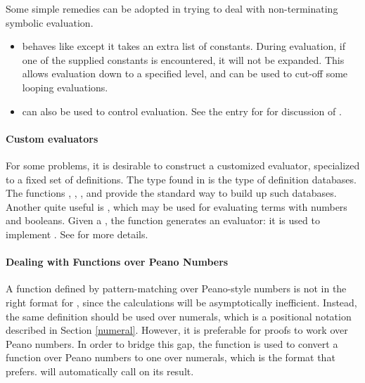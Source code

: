 {Some simple remedies can be adopted in trying to deal with
non-terminating symbolic evaluation.
\begin{itemize}
\item {} behaves like  except
  it takes an extra list of constants. During
  evaluation, if one of the supplied constants is encountered, it will
  not be expanded. This allows evaluation down to a specified level,
  and can be used to cut-off some looping evaluations.
\item {} can also be used to control
 evaluation. See the \REFERENCE{} entry for  for
 discussion of .

\end{itemize}

\paragraph{Custom evaluators}

For some problems, it is desirable to construct a customized
evaluator, specialized to a fixed set of definitions. The 
type found in  is the type of definition databases. The
functions , , , and
 provide the standard way to build up such
databases. Another quite useful  is
, which may be used for evaluating
terms with numbers and booleans.  Given a , the function
 generates an evaluator: it is used to implement .
See \REFERENCE{} for more details.

\paragraph{Dealing with Functions over Peano Numbers}

A function defined by pattern-matching over Peano-style numbers is not
in the right format for , since the calculations will be
asymptotically inefficient. Instead, the same definition should be
used over numerals, which is a positional notation described in
Section \ref{numeral}. However, it is preferable for proofs to work
over Peano numbers. In order to bridge this gap, the function
 is used to convert a function
over Peano numbers to one over numerals, which is the format that
 prefers.  will automatically call
 on its result.

}
